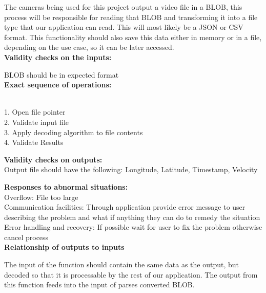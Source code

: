 \documentclass[10pt,draftclsnofoot,onecolumn]{IEEEtran}
\begin{document}
 
 The cameras being used for this project output a video file in a BLOB, this process will be responsible for reading that BLOB and transforming it into a file type that our application can read. This will most likely be a JSON or CSV format. This functionality should also save this data either in memory or in a file, depending on the use case, so it can be later accessed.\\
 \vspace{5mm}
 \textbf{Validity checks on the inputs:}\\
  \vspace{5mm}

  BLOB should be in expected format
\\
 \vspace{5mm}
\textbf{Exact sequence of operations: }\\\\
 \vspace{5mm}

1. Open file pointer\\
2. Validate input file\\
3. Apply decoding algorithm to file contents\\
4. Validate Results\\

 \vspace{5mm}

\textbf{Validity checks on outputs: }\\
 \vspace{5mm}
Output file should have the following: Longitude, Latitude, Timestamp, Velocity

 \vspace{5mm}

\textbf{Responses to abnormal situations:}\\
 \vspace{5mm}
 Overflow: File too large\\
 Communication facilities: Through application provide error message to user describing the problem and what if anything they can do to remedy the situation \\
 Error handling and recovery: If possible wait for user to fix the problem otherwise cancel process\\

 \vspace{5mm}
\textbf{Relationship of outputs to inputs }\\
 \vspace{2mm}

The input of the function should contain the same data as the output, but decoded so that it is processable by the rest of our application. The output from this function feeds into the input of parses converted BLOB. \\
\vspace{5mm}
\end{document}
